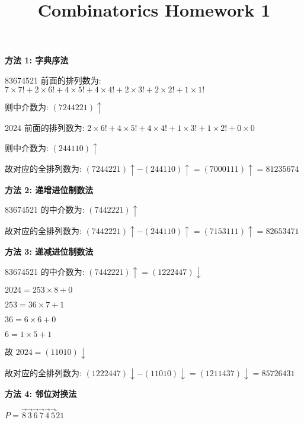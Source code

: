 \documentclass[12pt]{article}
\begin{document}
\begin{CJK}{UTF8}{gbsn}
 
 
\title{Combinatorics Homework 1}
\maketitle

\noindent\textbf{方法 1: 字典序法}

83674521 前面的排列数为: $7 \times 7! + 2 \times 6! + 4 \times 5! + 4 \times 4! + 2 \times 3! + 2 \times 2! + 1 \times 1!$

则中介数为: $(7244221)\uparrow$

2024 前面的排列数为: $2 \times 6! + 4 \times 5! + 4 \times 4! + 1 \times 3! + 1 \times 2! + 0 \times 0$

则中介数为: $(244110)\uparrow$

故对应的全排列数为: $(7244221)\uparrow - (244110)\uparrow = (7000111)\uparrow = 81235674$

\vspace{10pt}

\noindent\textbf{方法 2: 递增进位制数法}

83674521 的中介数为: $(7442221)\uparrow$

故对应的全排列数为: $(7442221)\uparrow - (244110)\uparrow = (7153111)\uparrow = 82653471$

\vspace{10pt}

\noindent\textbf{方法 3: 递减进位制数法}

83674521 的中介数为: $(7442221)\uparrow = (1222447)\downarrow$

$2024 = 253 \times 8 + 0$

$253 = 36 \times 7 + 1$

$36 = 6 \times 6 + 0$

$6 = 1 \times 5 + 1$

故 $2024 = (11010)\downarrow$

故对应的全排列数为: $(1222447)\downarrow - (11010)\downarrow = (1211437)\downarrow = 85726431$

\vspace{10pt}

\noindent\textbf{方法 4: 邻位对换法}

$P = \overrightarrow{8}\overrightarrow{3}\overrightarrow{6}\overrightarrow{7}\overrightarrow{4}\overrightarrow{5}\overleftarrow{2}1$


\end{CJK}
\end{document}
